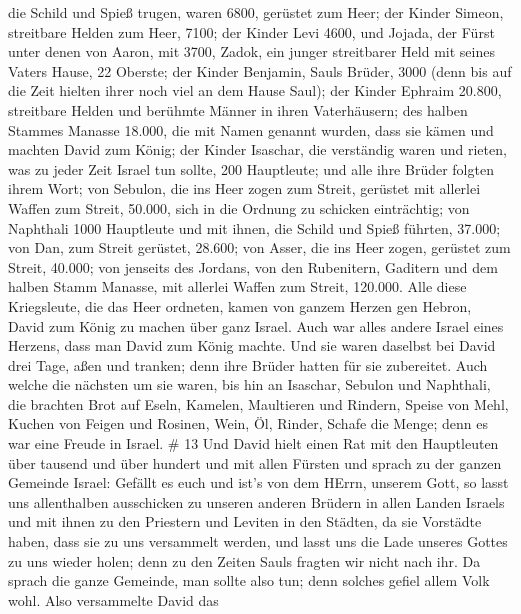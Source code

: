 die Schild und Spieß trugen, waren 6800, gerüstet zum Heer;
 der Kinder Simeon, streitbare Helden zum Heer, 7100;
 der Kinder Levi 4600,  und Jojada, der Fürst
unter denen von Aaron, mit 3700,  Zadok, ein junger
streitbarer Held mit seines Vaters Hause, 22 Oberste;  der
Kinder Benjamin, Sauls Brüder, 3000 (denn bis auf die Zeit hielten ihrer
noch viel an dem Hause Saul);  der Kinder Ephraim 20.800,
streitbare Helden und berühmte Männer in ihren Vaterhäusern;
 des halben Stammes Manasse 18.000, die mit Namen genannt
wurden, dass sie kämen und machten David zum König;  der
Kinder Isaschar, die verständig waren und rieten, was zu jeder Zeit
Israel tun sollte, 200 Hauptleute; und alle ihre Brüder folgten ihrem
Wort;  von Sebulon, die ins Heer zogen zum Streit, gerüstet
mit allerlei Waffen zum Streit, 50.000, sich in die Ordnung zu schicken
einträchtig;  von Naphthali 1000 Hauptleute und mit ihnen,
die Schild und Spieß führten, 37.000;  von Dan, zum Streit
gerüstet, 28.600;  von Asser, die ins Heer zogen, gerüstet
zum Streit, 40.000;  von jenseits des Jordans, von den
Rubenitern, Gaditern und dem halben Stamm Manasse, mit allerlei Waffen
zum Streit, 120.000.  Alle diese Kriegsleute, die das Heer
ordneten, kamen von ganzem Herzen gen Hebron, David zum König zu machen
über ganz Israel. Auch war alles andere Israel eines Herzens, dass man
David zum König machte.  Und sie waren daselbst bei David
drei Tage, aßen und tranken; denn ihre Brüder hatten für sie zubereitet.
 Auch welche die nächsten um sie waren, bis hin an
Isaschar, Sebulon und Naphthali, die brachten Brot auf Eseln, Kamelen,
Maultieren und Rindern, Speise von Mehl, Kuchen von Feigen und Rosinen,
Wein, Öl, Rinder, Schafe die Menge; denn es war eine Freude in Israel.
\# 13  Und David hielt einen Rat mit den Hauptleuten über
tausend und über hundert und mit allen Fürsten  und sprach
zu der ganzen Gemeinde Israel: Gefällt es euch und ist's von dem HErrn,
unserem Gott, so lasst uns allenthalben ausschicken zu unseren anderen
Brüdern in allen Landen Israels und mit ihnen zu den Priestern und
Leviten in den Städten, da sie Vorstädte haben, dass sie zu uns
versammelt werden,  und lasst uns die Lade unseres Gottes zu
uns wieder holen; denn zu den Zeiten Sauls fragten wir nicht nach ihr.
 Da sprach die ganze Gemeinde, man sollte also tun; denn
solches gefiel allem Volk wohl.  Also versammelte David das

